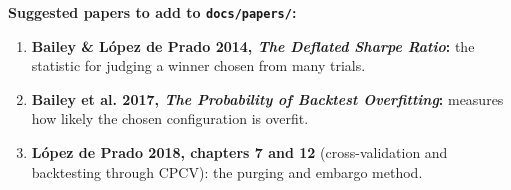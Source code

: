 \documentclass{article}
\begin{document}
\textbf{Suggested papers to add to \texttt{docs/\allowbreak{}papers/\allowbreak{}}:}

\begin{enumerate}

\item \textbf{Bailey \& López de Prado 2014, \emph{The Deflated Sharpe Ratio}:} the statistic for judging a winner chosen from many trials.

\item \textbf{Bailey et al. 2017, \emph{The Probability of Backtest Overfitting}:} measures how likely the chosen configuration is overfit.

\item \textbf{López de Prado 2018, chapters 7 and 12} (cross-validation and backtesting through CPCV): the purging and embargo method.

\end{enumerate}
\end{document}
